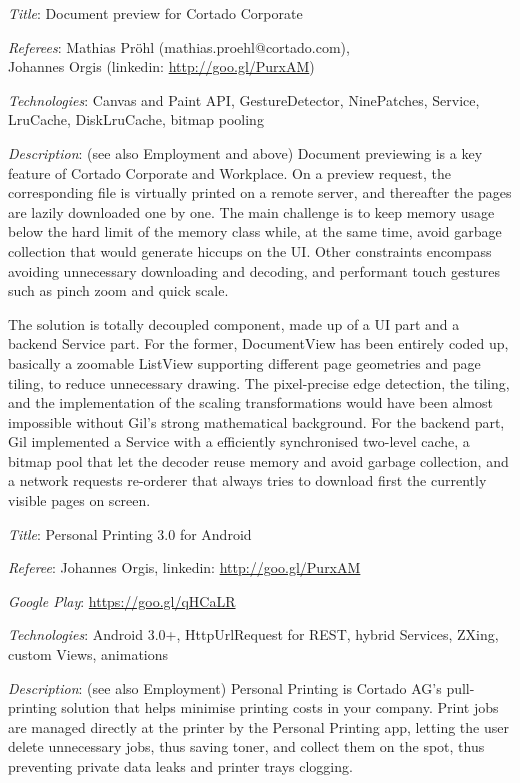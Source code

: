 \documentclass[letterpaper]{article}
\renewenvironment{itemize}{
  \begin{list}{}{
    \setlength{\leftmargin}{1.5em}
  }
}{
  \end{list}
}
\newenvironment{itemize1}{
  \begin{list}{}{
    \setlength{\leftmargin}{0em}
  }
}{
  \end{list}
}
\begin{document}
\begin{itemize1}
\item
\begin{itemize}
\item {\it Title}: Document preview for Cortado Corporate 
\item {\it Referees}: Mathias Pr\"ohl (mathias.proehl@cortado.com),
    \\\phantom{xxxxxxx.}Johannes Orgis (linkedin: \url{http://goo.gl/PurxAM})
\item {\it Technologies}: Canvas and Paint API, GestureDetector, NinePatches, Service, LruCache, DiskLruCache, bitmap pooling
\item {\it Description}: (see also Employment and above) Document previewing is a key feature of Cortado Corporate and Workplace. On a preview request, the corresponding file is virtually printed on a remote server, and thereafter the pages are lazily downloaded one by one. The main challenge is to keep memory usage below the hard limit of the memory class while, at the same time, avoid garbage collection that would generate hiccups on the UI. Other constraints encompass avoiding unnecessary downloading and decoding, and performant touch gestures such as pinch zoom and quick scale.
\medskip

The solution is totally decoupled component, made up of a UI part and a backend Service part. For the former, DocumentView has been entirely coded up, basically a zoomable ListView supporting different page geometries and page tiling, to reduce unnecessary drawing. The pixel-precise edge detection, the tiling, and the implementation of the scaling transformations would have been almost impossible without Gil's strong mathematical background. For the backend part, Gil implemented a Service with a efficiently synchronised two-level cache, a bitmap pool that let the decoder reuse memory and avoid garbage collection, and a network requests re-orderer that always tries to download first the currently visible pages on screen.
\end{itemize}

\bigskip

\item
\begin{itemize}
\item {\it Title}: Personal Printing 3.0 for Android 
\item {\it Referee}: Johannes Orgis, linkedin: \url{http://goo.gl/PurxAM}
\item {\it Google Play}: \url{https://goo.gl/qHCaLR}
\item {\it Technologies}: Android 3.0+, HttpUrlRequest for REST, hybrid Services, ZXing, custom Views, animations
\item {\it Description}: (see also Employment) Personal Printing is Cortado AG's pull-printing solution that helps minimise printing costs in your company. Print jobs are managed directly at the printer by the Personal Printing app, letting the user delete unnecessary jobs, thus saving toner, and collect them on the spot, thus preventing private data leaks and printer trays clogging.
\medskip


\end{itemize}
\end{itemize1}
\end{document}
